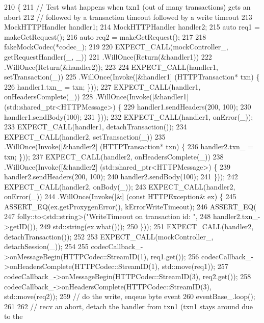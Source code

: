\begin{DoxyCode}
210                                                      \{
211   \textcolor{comment}{// Test what happens when txn1 (out of many transactions) gets an abort}
212   \textcolor{comment}{// followed by a transaction timeout followed by a write timeout}
213   MockHTTPHandler handler1;
214   MockHTTPHandler handler2;
215   \textcolor{keyword}{auto} req1 = makeGetRequest();
216   \textcolor{keyword}{auto} req2 = makeGetRequest();
217 
218   fakeMockCodec(*codec\_);
219 
220   EXPECT\_CALL(mockController\_, getRequestHandler(\_, \_))
221     .WillOnce(Return(&handler1))
222     .WillOnce(Return(&handler2));
223 
224   EXPECT\_CALL(handler1, setTransaction(\_))
225     .WillOnce(Invoke([&handler1] (HTTPTransaction* txn) \{
226           handler1.txn_ = txn; \}));
227   EXPECT\_CALL(handler1, onHeadersComplete(\_))
228     .WillOnce(Invoke([&handler1] (std::shared\_ptr<HTTPMessage>) \{
229           handler1.sendHeaders(200, 100);
230           handler1.sendBody(100);
231         \}));
232   EXPECT\_CALL(handler1, onError(\_));
233   EXPECT\_CALL(handler1, detachTransaction());
234   EXPECT\_CALL(handler2, setTransaction(\_))
235     .WillOnce(Invoke([&handler2] (HTTPTransaction* txn) \{
236           handler2.txn_ = txn; \}));
237   EXPECT\_CALL(handler2, onHeadersComplete(\_))
238     .WillOnce(Invoke([&handler2] (std::shared\_ptr<HTTPMessage>) \{
239           handler2.sendHeaders(200, 100);
240           handler2.sendBody(100);
241         \}));
242   EXPECT\_CALL(handler2, onBody(\_));
243   EXPECT\_CALL(handler2, onError(\_))
244     .WillOnce(Invoke([&] (\textcolor{keyword}{const} HTTPException& ex) \{
245           ASSERT\_EQ(ex.getProxygenError(), kErrorWriteTimeout);
246           ASSERT\_EQ(
247             folly::to<std::string>(\textcolor{stringliteral}{"WriteTimeout on transaction id: "},
248               handler2.txn_->getID()),
249             std::string(ex.what()));
250         \}));
251   EXPECT\_CALL(handler2, detachTransaction());
252 
253   EXPECT\_CALL(mockController\_, detachSession(\_));
254 
255   codecCallback\_->onMessageBegin(HTTPCodec::StreamID(1), req1.get());
256   codecCallback\_->onHeadersComplete(HTTPCodec::StreamID(1), std::move(req1));
257   codecCallback\_->onMessageBegin(HTTPCodec::StreamID(3), req2.get());
258   codecCallback\_->onHeadersComplete(HTTPCodec::StreamID(3), std::move(req2));
259   \textcolor{comment}{// do the write, enqeue byte event}
260   eventBase\_.loop();
261 
262   \textcolor{comment}{// recv an abort, detach the handler from txn1 (txn1 stays around due to the}

\end{DoxyCode}
